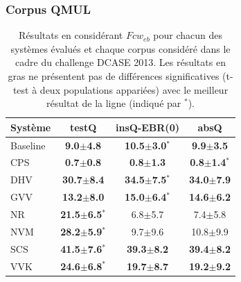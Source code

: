 \subsubsection{Corpus QMUL}

\begin{table} 
\begin{center}  
\begin{tabular}{lccc}  
Système  & testQ & insQ-EBR(0) & absQ \\ 
\hline 
Baseline & \textbf{ 9.0$\pm$4.8}     & \textbf{10.5$\pm$3.0$^*$}   & \textbf{ 9.9$\pm$3.5} \\ 
CPS      & \textbf{0.7$\pm$0.8}      & \textbf{0.8$\pm$1.3}        & \textbf{0.8$\pm$1.4$^*$} \\ 
DHV      & \textbf{30.7$\pm$8.4}     & \textbf{34.5$\pm$7.5$^*$}   & \textbf{34.0$\pm$7.9} \\ 
GVV      & \textbf{13.2$\pm$8.0}     & \textbf{15.0$\pm$6.4$^*$}   & \textbf{14.6$\pm$6.2} \\ 
NR       & \textbf{21.5$\pm$6.5$^*$} &  6.8$\pm$5.7                &  7.4$\pm$5.8 \\ 
NVM      & \textbf{28.2$\pm$5.9$^*$} &  9.7$\pm$9.6                & 10.8$\pm$9.9 \\ 
SCS      & \textbf{41.5$\pm$7.6$^*$} & \textbf{39.3$\pm$8.2}       & \textbf{39.4$\pm$8.2} \\ 
VVK      & \textbf{24.6$\pm$6.8$^*$} & \textbf{19.7$\pm$8.7}       & \textbf{19.2$\pm$9.2} \\  
\hline
\end{tabular} 
\end{center} 
\caption[Résultats en considérant $Fcw_{eb}$ pour chacun des systèmes évalués et chaque corpus considéré dans le cadre du challenge DCASE 2013]{Résultats en considérant $Fcw_{eb}$ pour chacun des systèmes évalués et chaque corpus considéré dans le cadre du challenge DCASE 2013. Les résultats en gras ne présentent pas de différences significatives (t-test à deux populations appariées) avec le meilleur résultat de la ligne (indiqué par $^*$).} 
\label{tab:qmul} 
\end{table} 

